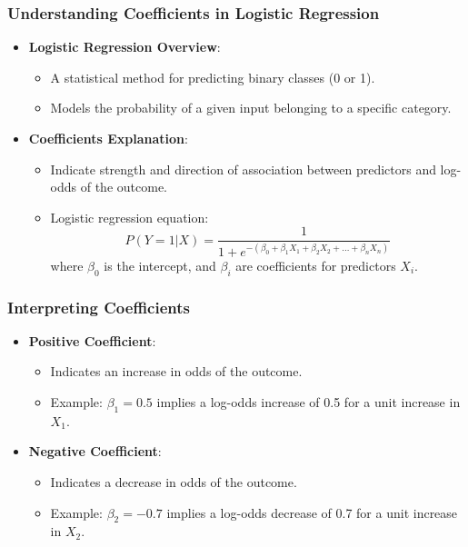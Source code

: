 \documentclass[aspectratio=169]{beamer}
\begin{document}
\begin{frame}[fragile]
    \frametitle{Understanding Coefficients in Logistic Regression}
    \begin{itemize}
        \item \textbf{Logistic Regression Overview}:
        \begin{itemize}
            \item A statistical method for predicting binary classes (0 or 1).
            \item Models the probability of a given input belonging to a specific category.
        \end{itemize}
        \item \textbf{Coefficients Explanation}:
        \begin{itemize}
            \item Indicate strength and direction of association between predictors and log-odds of the outcome.
            \item Logistic regression equation:
            \begin{equation}
                P(Y=1|X) = \frac{1}{1 + e^{-(\beta_0 + \beta_1X_1 + \beta_2X_2 + \ldots + \beta_nX_n)}}
            \end{equation}
            where \( \beta_0 \) is the intercept, and \( \beta_i \) are coefficients for predictors \( X_i \).
        \end{itemize}
    \end{itemize}
\end{frame}

\begin{frame}[fragile]
    \frametitle{Interpreting Coefficients}
    \begin{itemize}
        \item \textbf{Positive Coefficient}:
        \begin{itemize}
            \item Indicates an increase in odds of the outcome.
            \item Example: \( \beta_1 = 0.5 \) implies a log-odds increase of 0.5 for a unit increase in \( X_1 \).
        \end{itemize}
        \item \textbf{Negative Coefficient}:
        \begin{itemize}
            \item Indicates a decrease in odds of the outcome.
            \item Example: \( \beta_2 = -0.7 \) implies a log-odds decrease of 0.7 for a unit increase in \( X_2 \).
        \end{itemize}
    \end{itemize}
\end{frame}
\end{document}
